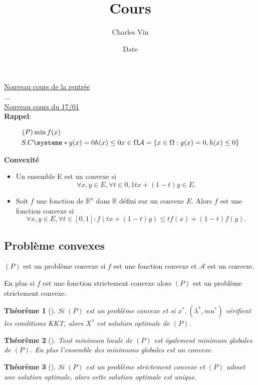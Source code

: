 \documentclass{article}
\title{Cours}
\author{Charles Vin}
\date{Date}
\theoremstyle{plain}%
\newtheorem{thm}{Théorème}[section]
\theoremstyle{definition}
\theoremstyle{remark}
\begin{document}
\maketitle

\underline{Nouveau cours de la rentrée} \\
... \\ 
\underline{Nouveau cours du 17/01} \\

\textbf{Rappel}:

\begin{align*}
    (P) &\min f(x) \\
    S.C &\systeme*{
        g(x) = 0
        h(x) \leq 0
        x \in \Omega 
    }
    \mathcal{A} = \{x \in \Omega : g(x) = 0, h(x) \leq 0\}
\end{align*}

\textbf{Convexité}
\begin{itemize}
    \item Un ensemble E est un convexe si 
    \[
        \forall x,y \in E, \forall t \in {0,1} tx + (1-t)y \in E
    .\]
    \item Soit $ f $ une fonction de $ \mathbb{R}^n $ dans $ \mathbb{R} $ défini sur un convexe $ E $. Alors $ f $ est une fonction convexe si 
    \[
        \forall x,y \in E, \forall t \in [0,1] : f(tx + (1-t)y) \leq tf(x) + (1-t)f(y)
    .\]
\end{itemize}

\subsection{Problème convexes}
$ (P) $ est un problème convexe si $ f $  est une fonction convexe et $ \mathcal{A} $ est un convexe. 

En plus si $ f $ est une fonction strictement convexe alors $ (P) $ est un problème strictement convexe.

\begin{thm}[]
    Si $ (P) $ est un problème convexe et si $ x^*, (\lambda ^*, mu^*) $ vérifient les conditions KKT, alors $ X^* $ est solution optimale de $ (P) $.
\end{thm}
\begin{thm}[]
    Tout minimum locale de $ (P) $ est également minimum globales de $ (P) $. En plus l'ensemble des minimums globales est un convexe.
\end{thm}
\begin{thm}[]
    Si $ (P) $ est un problème strictement convexe et $ (P) $ admet une solution optimale, alors cette solution optimale est unique.
\end{thm}
\end{document}
